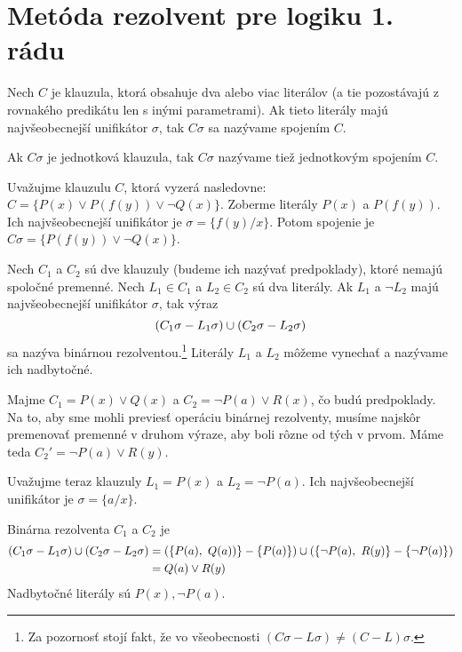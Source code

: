 \section {Metóda rezolvent pre logiku 1. rádu}

\begin{definicia}[Spojenie]
    Nech $C$ je klauzula, ktorá obsahuje dva alebo viac literálov 
    (a tie pozostávajú z rovnakého predikátu len s inými parametrami).
    Ak tieto literály majú najvšeobecnejší unifikátor $\sigma$, 
    tak $C\sigma$ sa nazývame spojením $C$. 
    
    Ak $C\sigma$ je jednotková klauzula, tak $C\sigma$ nazývame tiež
    jednotkovým spojením $C$.
\end{definicia}

\begin{priklad}
    Uvažujme klauzulu $C$, ktorá vyzerá nasledovne: 
    $C = \{ P(x) \lor P(f(y)) \lor \neg Q(x)\}$. Zoberme literály
    $P(x)$ a $P(f(y))$. Ich najvšeobecnejší unifikátor je
    $\sigma=\{ f(y) / x \}$. Potom spojenie je 
    $C\sigma = \{P(f(y)) \lor \neg Q(x) \}$.
\end{priklad}

\begin{definicia}
    Nech $C_1$ a $C_2$ sú dve klauzuly (budeme ich nazývať predpoklady), 
    ktoré nemajú spoločné premenné. Nech $L_1 \in C_1$ a $L_2 \in C_2$ 
    sú dva literály. Ak $L_1$ a $\neg L_2$ majú 
    najvšeobecnejší unifikátor $\sigma$, tak výraz
    \begin{equation*}
        (C_1\sigma - L_1\sigma) \cup (C_2\sigma - L_2\sigma)
    \end{equation*}
    sa nazýva binárnou rezolventou.\footnote{Za pozornosť stojí fakt, že
    vo všeobecnosti $(C\sigma - L\sigma) \ne (C-L)\sigma$.} 
    Literály $L_1$ a $L_2$ môžeme vynechať a nazývame ich nadbytočné.
\end{definicia}

\begin{priklad}
    Majme $C_1 = P(x) \lor Q(x)$ a $C_2 = \neg P(a) \lor R(x)$, 
    čo budú predpoklady. Na to, aby sme mohli previesť operáciu
    binárnej rezolventy, musíme najskôr premenovať premenné v druhom
    výraze, aby boli rôzne od tých v prvom. Máme teda
    $C_2' = \neg P(a) \lor R(y)$.

    Uvažujme teraz klauzuly $L_1 = P(x)$ a $L_2 = \neg P(a)$.
    Ich najvšeobecnejší unifikátor je $\sigma = \{a/x\}$.

    Binárna rezolventa $C_1$ a $C_2$ je
    \begin{equation*}
    \begin{split}
        (C_1\sigma - L_1\sigma) \cup (C_2\sigma - L_2\sigma) 
        &= (\{P(a),\ Q(a))\} - \{P(a)\}) \cup
            (\{\neg P(a),\ R(y)\}-\{\neg P(a)\}) \\
        &= Q(a)\lor R(y)
    \end{split}
    \end{equation*}
    Nadbytočné literály sú $P(x), \neg P(a)$.
\end{priklad}

